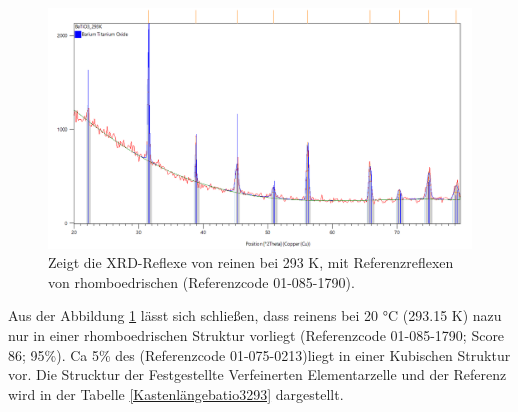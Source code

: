 \documentclass[12pt, a4paper]{article}
\begin{document}
\begin{figure}[h!]
  \begin{center}
    \includegraphics[scale=0.5]{BaTiO3293.png}
  \end{center}
\caption{Zeigt die XRD-Reflexe von reinen  bei 293 K, mit Referenzreflexen von rhomboedrischen  (Referenzcode 01-085-1790).}
\label{BaTiO3293}
\end{figure}
\noindent
Aus der Abbildung \ref{BaTiO3293} lässt sich schließen, dass reinens  bei 20 °C (293.15 K) nazu nur in einer 
rhomboedrischen Struktur vorliegt (Referenzcode 01-085-1790; Score 86; 95\%). Ca 5\% des  (Referenzcode 01-075-0213)liegt in einer Kubischen Struktur vor. Die Strucktur der 
Festgestellte Verfeinerten Elementarzelle und der Referenz wird in der Tabelle \ref{Kastenlängebatio3293} dargestellt.
\end{document}
